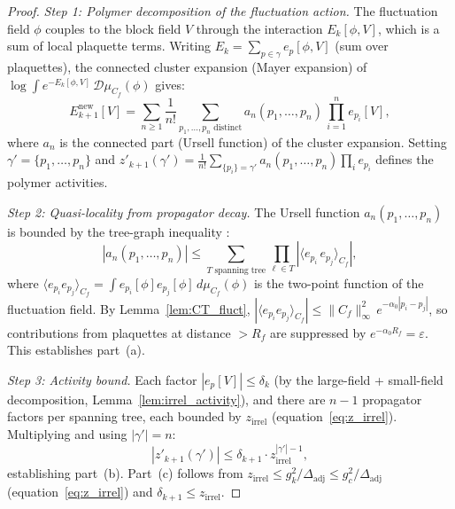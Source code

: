 \documentclass[11pt,a4paper]{amsart}
\theoremstyle{definition}
\newcommand{\Cf}{C_f}
\newcommand{\gB}{g^2_c}
\begin{document}
\begin{proof}
\emph{Step 1: Polymer decomposition of the fluctuation action.}
The fluctuation field $\phi$ couples to the block field $V$ through the interaction
$E_k[\phi, V]$, which is a sum of local plaquette terms.  Writing
$E_k = \sum_{p\in\gamma} e_p[\phi, V]$ (sum over plaquettes), the
connected cluster expansion (Mayer expansion) of
$\log \int e^{-E_k[\phi,V]}\,\mathcal{D}\mu_{C_f}(\phi)$
gives:
\begin{equation}
\label{eq:mayer_exp}
  E^{\mathrm{new}}_{k+1}[V]
  = \sum_{n\ge 1}\frac{1}{n!}
    \sum_{p_1,\ldots,p_n \text{ distinct}} a_n(p_1,\ldots,p_n)\,
    \prod_{i=1}^n e_{p_i}[V],
\end{equation}
where $a_n$ is the connected part (Ursell function) of the cluster expansion.
Setting $\gamma' = \{p_1,\ldots,p_n\}$ and
$z'_{k+1}(\gamma') = \frac{1}{n!}\sum_{\{p_i\}=\gamma'} a_n(p_1,\ldots,p_n)\prod_i e_{p_i}$
defines the polymer activities.

\emph{Step 2: Quasi-locality from propagator decay.}
The Ursell function $a_n(p_1,\ldots,p_n)$ is bounded by the tree-graph inequality
\cite[Prop.~2.3]{B87}:
\[
  |a_n(p_1,\ldots,p_n)| \le \sum_{T\text{ spanning tree}} \prod_{\ell\in T} |\langle e_{p_i}\,e_{p_j}\rangle_{C_f}|,
\]
where $\langle e_{p_i} e_{p_j}\rangle_{C_f} = \int e_{p_i}[\phi] e_{p_j}[\phi]\,d\mu_{C_f}(\phi)$
is the two-point function of the fluctuation field.  By Lemma~\ref{lem:CT_fluct},
$|\langle e_{p_i} e_{p_j}\rangle_{C_f}| \le \|\Cf\|^2_\infty\,e^{-\alpha_0|p_i-p_j|}$,
so contributions from plaquettes at distance $> R_f$ are suppressed by $e^{-\alpha_0 R_f} = \varepsilon$.
This establishes part~(a).

\emph{Step 3: Activity bound.}
Each factor $|e_{p}[V]| \le \delta_k$ (by the large-field + small-field decomposition,
Lemma~\ref{lem:irrel_activity}), and there are $n-1$ propagator factors per spanning
tree, each bounded by $z_{\mathrm{irrel}}$ (equation~\eqref{eq:z_irrel}).
Multiplying and using $|\gamma'| = n$:
\[
  |z'_{k+1}(\gamma')| \le \delta_{k+1} \cdot z_{\mathrm{irrel}}^{|\gamma'|-1},
\]
establishing part~(b).  Part~(c) follows from
$z_{\mathrm{irrel}} \le g^2_k/\Delta_{\mathrm{adj}} \le \gB/\Delta_{\mathrm{adj}}$ (equation~\eqref{eq:z_irrel}) and
$\delta_{k+1} \le z_{\mathrm{irrel}}$.
\end{proof}
\end{document}

